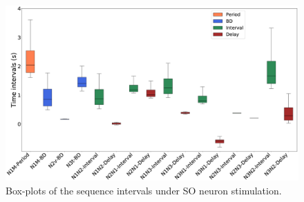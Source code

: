 \begin{figure}[h!]
    \centering
\includegraphics[width=\textwidth]{img/results-paper-modelo/figure9.eps}
\caption{Box-plots of the sequence intervals under SO neuron stimulation.}
\label{fig:invariant so boxplot}
\end{figure}
\clearpage
\newpage
